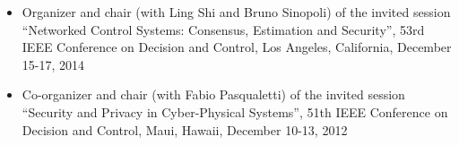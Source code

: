 \documentclass[10pt, a4paper]{article}
\begin{document}
\begin{itemize}
\item Organizer and chair (with Ling Shi and Bruno Sinopoli) of the invited session “Networked Control Systems: Consensus, Estimation and Security”, 53rd IEEE Conference on Decision and Control, Los Angeles, California, December 15-17, 2014\\
%
\item Co-organizer and chair (with Fabio Pasqualetti) of the invited session ``Security and Privacy in Cyber-Physical Systems'', 51th IEEE Conference on Decision and Control, Maui, Hawaii, December 10-13, 2012\\
%
\end{itemize}






%

\end{document}

